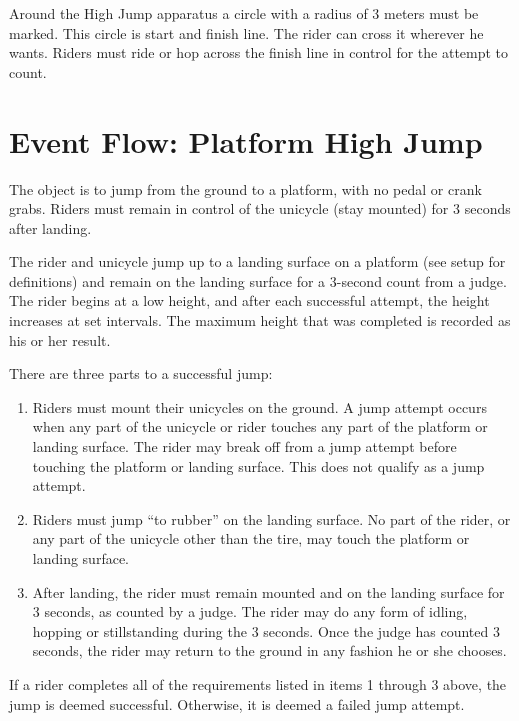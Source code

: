Around the High Jump apparatus a circle with a radius of 3 meters must be marked.
This circle is start and finish line.
The rider can cross it wherever he wants.
Riders must ride or hop across the finish line in control for the attempt to count.

\section{Event Flow: Platform High Jump}
The object is to jump from the ground to a platform, with no pedal or crank grabs.
Riders must remain in control of the unicycle (stay mounted) for 3 seconds after landing.

The rider and unicycle jump up to a landing surface on a platform (see setup for definitions) and remain on the landing surface for a 3-second count from a judge.
The rider begins at a low height, and after each successful attempt, the height increases at set intervals.
The maximum height that was completed is recorded as his or her result.

There are three parts to a successful jump:
\begin{enumerate}
\item Riders must mount their unicycles on the ground.
A jump attempt occurs when any part of the unicycle or rider touches any part of the platform or landing surface.
The rider may break off from a jump attempt before touching the platform or landing surface.
This does not qualify as a jump attempt.
\item Riders must jump ``to rubber'' on the landing surface.
No part of the rider, or any part of the unicycle other than the tire, may touch the platform or landing surface.
\item After landing, the rider must remain mounted and on the landing surface for 3 seconds, as counted by a judge.
The rider may do any form of idling, hopping or stillstanding during the 3 seconds.
Once the judge has counted 3 seconds, the rider may return to the ground in any fashion he or she chooses.
\end{enumerate}
If a rider completes all of the requirements listed in items 1 through 3 above, the jump is deemed successful.
Otherwise, it is deemed a failed jump attempt.

